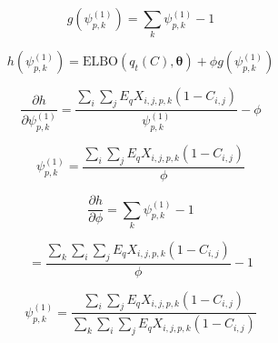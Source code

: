 \documentclass[12pt]{article}
\theoremstyle{definition}
\begin{document}
\begin{equation}
g(\psi_{p, k}^{(1)}) = \sum_{k}\psi_{p, k}^{(1)} - 1
\end{equation}

\begin{equation}
h(\psi_{p, k}^{(1)}) = \textrm{ELBO}(q_{t}(C), \boldsymbol{\theta}) + \phi g(\psi_{p, k}^{(1)})
\end{equation}

\begin{equation}
\frac{\partial{h}}{\partial{\psi_{p, k}^{(1)}}} = \frac{\sum_{i}\sum_{j}E_{q} X_{i,j,p,k} (1 - C_{i,j})}{\psi_{p, k}^{(1)}} - \phi
\end{equation}

\begin{equation}
\psi_{p, k}^{(1)} = \frac{\sum_{i}\sum_{j}E_{q} X_{i,j,p,k} (1 - C_{i,j})}{\phi}
\end{equation}

\begin{equation}
\frac{\partial{h}}{\partial{\phi}} = \sum_{k}\psi_{p, k}^{(1)} - 1
\end{equation}

\begin{equation}
= \frac{\sum_{k} \sum_{i}\sum_{j}E_{q} X_{i,j,p,k} (1 - C_{i,j})}{\phi} - 1
\end{equation}



\begin{equation}
\psi_{p, k}^{(1)} = \frac{\sum_{i}\sum_{j}E_{q} X_{i,j,p,k} (1 - C_{i,j})}{\sum_{k} \sum_{i}\sum_{j}E_{q} X_{i,j,p,k} (1 - C_{i,j})}
\end{equation}
\end{document}

